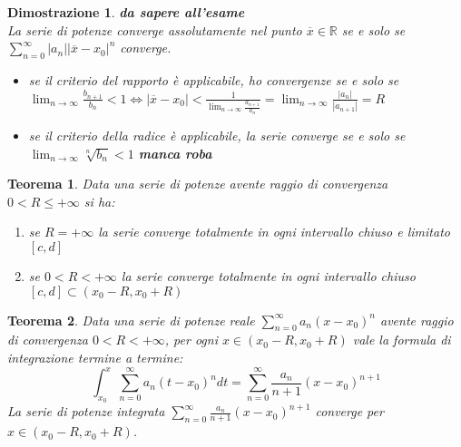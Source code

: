 \documentclass{scrreprt}
\newtheorem{teorema}{Teorema}
\newenvironment{thm}{\begin{mdframed}[backgroundcolor=Ivory2]\begin{teorema}}{\end{teorema}\end{mdframed}}
\newtheorem{demnstrn}{Dimostrazione}
\newenvironment{dimostrazione}{\begin{mdframed}[backgroundcolor=LightCyan1]\begin{demnstrn}}{\end{demnstrn}\end{mdframed}}
\begin{document}
\begin{dimostrazione} 
	\emph{\textbf{da sapere all'esame}}\\
	La serie di potenze converge assolutamente nel punto $\overline{x} \in \mathbb{R}$ se e solo se\\
	$\sum_{n=0}^\infty \left\lvert a_n\right\rvert  \left\lvert \overline{x} -x_0\right\rvert ^n$ converge.\\
	\begin{itemize}
		\item se il criterio del rapporto è applicabile, ho convergenze se e solo se\\$\lim_{n\to\infty} \frac{b_{n+1}}{b_n} < 1\Leftrightarrow \left\lvert \overline{x} -x_0 \right\rvert < \frac{1}{\lim_{n\to\infty} \frac{a_{n+1}}{a_n}} = \lim_{n\to\infty} \frac{\left\lvert a_n\right\rvert }{\left\lvert a_{n+1}\right\rvert } = R$
		\item se il criterio della radice è applicabile, la serie converge se e solo se\\$\lim_{n\to\infty} \sqrt[n]{b_n}<1$ \textbf{manca roba}
	\end{itemize}
\end{dimostrazione}

\begin{thm} %
	Data una serie di potenze avente raggio di convergenza $0<R\leq +\infty$ si ha:
	\begin{enumerate}
		\item[$i)$] se $R=+\infty$ la serie converge totalmente in ogni intervallo chiuso e limitato $\left[c,d\right] $
		\item[$ii)$] se $0<R<+\infty$ la serie converge totalmente in ogni intervallo chiuso  $\left[c,d\right] \subset \left(x_0-R,x_0+R\right)$
	\end{enumerate}
\end{thm}


\begin{thm}
	Data una serie di potenze reale $\sum_{n=0}^\infty a_n \left(x-x_0\right)^n$ avente raggio di convergenza $0<R<+\infty$, per ogni $x\in\left(x_0-R,x_0+R\right)$ vale la formula di integrazione termine a termine:
	\begin{equation}
		\int_{x_0}^{x} \sum_{n=0}^\infty a_n \left(t-x_0\right)^n dt = \sum_{n=0}^\infty \frac{a_n}{n+1} \left(x-x_0\right)^{n+1}
	\end{equation}
	La serie di potenze integrata $\sum_{n=0}^\infty \frac{a_n}{n+1} \left(x-x_0\right)^{n+1}$ converge per $x\in\left(x_0-R,x_0+R\right)$.
\end{thm}
\end{document}
